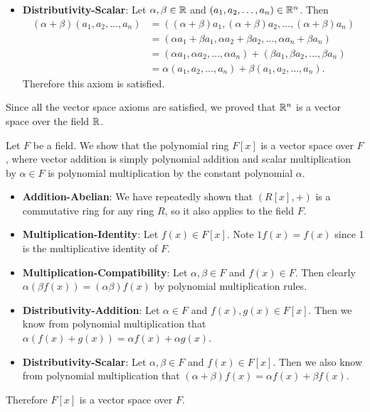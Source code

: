 \begin{example}
\begin{itemize}
        \item \textbf{Distributivity-Scalar}: Let $\alpha, \beta \in \mathbb{R}$ and $(a_1, a_2, \dots, a_n) \in \mathbb{R}^n$. Then
        \begin{align*}
            (\alpha+\beta)(a_1, a_2, \dots, a_n) &= ((\alpha+\beta)a_1, (\alpha+\beta)a_2, \dots, (\alpha+\beta)a_n)\\
            &= (\alpha a_1 + \beta a_1, \alpha a_2 + \beta a_2, \dots, \alpha a_n + \beta a_n)\\
            &= (\alpha a_1, \alpha a_2, \dots, \alpha a_n) + (\beta a_1, \beta a_2, \dots, \beta a_n)\\
            &= \alpha(a_1, a_2, \dots, a_n) + \beta(a_1, a_2, \dots, a_n).
        \end{align*}
        Therefore this axiom is satisfied.
    \end{itemize}

    Since all the vector space axioms are satisfied, we proved that $\mathbb{R}^n$ is a vector space over the field $\mathbb{R}$.
\end{example}

\begin{example}\label{example-polynomial-ring-over-field-is-vector-space}
    Let $F$ be a field. We show that the polynomial ring $F[x]$ is a vector space over $F$, where vector addition is simply polynomial addition and scalar multiplication by $\alpha \in F$ is polynomial multiplication by the constant polynomial $\alpha$.
    \begin{itemize}
        \item \textbf{Addition-Abelian}: We have repeatedly shown that $(R[x], +)$ is a commutative ring for any ring $R$, so it also applies to the field $F$.

        \item \textbf{Multiplication-Identity}: Let $f(x) \in F[x]$. Note $1f(x) = f(x)$ since 1 is the multiplicative identity of $F$.

        \item \textbf{Multiplication-Compatibility}: Let $\alpha, \beta \in F$ and $f(x) \in F$. Then clearly $\alpha(\beta f(x)) = (\alpha\beta)f(x)$ by polynomial multiplication rules.

        \item \textbf{Distributivity-Addition}: Let $\alpha \in F$ and $f(x), g(x) \in F[x]$. Then we know from polynomial multiplication that $\alpha(f(x) + g(x)) = \alpha f(x) + \alpha g(x)$.

        \item \textbf{Distributivity-Scalar}: Let $\alpha, \beta \in F$ and $f(x) \in F[x]$. Then we also know from polynomial multiplication that $(\alpha+\beta)f(x) = \alpha f(x) + \beta f(x)$.
    \end{itemize}
    Therefore $F[x]$ is a vector space over $F$.
\end{example}

